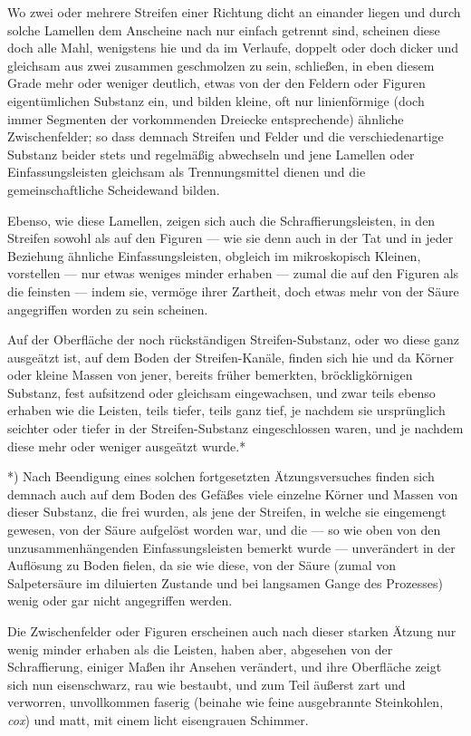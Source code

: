 \documentclass[a4paper, 11pt, oneside, german]{article}
\begin{document}
Wo zwei oder mehrere Streifen einer Richtung dicht an einander liegen und durch solche Lamellen dem Anscheine nach nur einfach getrennt sind, scheinen diese doch alle Mahl, wenigstens hie und da im Verlaufe, doppelt oder doch dicker und gleichsam aus zwei zusammen geschmolzen zu sein, schließen, in eben diesem Grade mehr oder weniger deutlich, etwas von der den Feldern oder Figuren eigentümlichen Substanz ein, und bilden kleine, oft nur linienförmige (doch immer Segmenten der vorkommenden Dreiecke entsprechende) ähnliche Zwischenfelder; so dass demnach Streifen und Felder und die verschiedenartige Substanz beider stets und regelmäßig abwechseln und jene Lamellen oder Einfassungsleisten gleichsam als Trennungsmittel dienen und die gemeinschaftliche Scheidewand bilden.

Ebenso, wie diese Lamellen, zeigen sich auch die Schraffierungsleisten, in den Streifen sowohl als auf den Figuren --- wie sie denn auch in der Tat und in jeder Beziehung ähnliche Einfassungsleisten, obgleich im mikroskopisch Kleinen, vorstellen --- nur etwas weniges minder erhaben --- zumal die auf den Figuren als die feinsten --- indem sie, vermöge ihrer Zartheit, doch etwas mehr von der Säure angegriffen worden zu sein scheinen.

Auf der Oberfläche der noch rückständigen Streifen-Substanz, oder wo diese ganz ausgeätzt ist, auf dem Boden der Streifen-Kanäle, finden sich hie und da Körner oder kleine Massen von jener, bereits früher bemerkten, bröckligkörnigen Substanz, fest aufsitzend oder gleichsam eingewachsen, und zwar teils ebenso erhaben wie die Leisten, teils tiefer, teils ganz tief, je nachdem sie ursprünglich seichter oder tiefer in der Streifen-Substanz eingeschlossen waren, und je nachdem diese mehr oder weniger ausgeätzt wurde.*

*) Nach Beendigung eines solchen fortgesetzten Ätzungsversuches finden sich demnach auch auf dem Boden des Gefäßes viele einzelne Körner und Massen von dieser Substanz, die frei wurden, als jene der Streifen, in welche sie eingemengt gewesen, von der Säure aufgelöst worden war, und die --- so wie oben von den unzusammenhängenden Einfassungsleisten bemerkt wurde --- unverändert in der Auflösung zu Boden fielen, da sie wie diese, von der Säure (zumal von Salpetersäure im diluierten Zustande und bei langsamen Gange des Prozesses) wenig oder gar nicht angegriffen werden.

Die Zwischenfelder oder Figuren erscheinen auch nach dieser starken Ätzung nur wenig minder erhaben als die Leisten, haben aber, abgesehen von der Schraffierung, einiger Maßen ihr Ansehen verändert, und ihre Oberfläche zeigt sich nun eisenschwarz, rau wie bestaubt, und zum Teil äußerst zart und verworren, unvollkommen faserig (beinahe wie feine ausgebrannte Steinkohlen, \emph{cox}) und matt, mit einem licht eisengrauen Schimmer.
\end{document}

